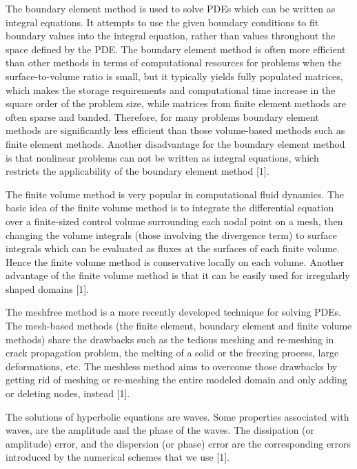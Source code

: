 \documentclass[a4paper,10pt,twoside]{article}
\begin{document}
The boundary element method is used to solve PDEs which can be
written as integral equations. It attempts
to use the given boundary conditions to fit boundary values into the integral
equation, rather than values throughout the space defined by the PDE. The boundary element method
is often more efficient than other methods in terms of computational resources
for problems when the surface-to-volume ratio is small, but it typically yields fully populated matrices, which makes
the storage requirements and computational time increase in the square order
of the problem size, while matrices from finite element methods are
often sparse and banded. Therefore, for many problems boundary element methods
are significantly less efficient than those volume-based methods such as finite
element methods. Another disadvantage for the boundary element method
is that nonlinear problems can not be written as integral equations, which restricts the applicability of the boundary element
method [1].

The finite volume method
is very popular in computational fluid dynamics. The basic idea of the finite
volume method is to integrate the differential equation over a finite-sized control
volume surrounding each nodal point on a mesh, then changing the volume
integrals (those involving the divergence term) to surface integrals which can
be evaluated as fluxes at the surfaces of each finite volume. Hence the finite
volume method is conservative locally on each volume. Another advantage of
the finite volume method is that it can be easily used for irregularly shaped
domains [1].

The meshfree method is a more recently developed technique
for solving PDEs. The mesh-based methods (the finite element, boundary
element and finite volume methods) share the drawbacks such as the tedious
meshing and re-meshing in crack propagation problem, the melting of a solid
or the freezing process, large deformations, etc. The meshless method aims
to overcome those drawbacks by getting rid of meshing or re-meshing the
entire modeled domain and only adding or deleting nodes, instead [1].

The solutions of hyperbolic equations are waves. Some properties associated with waves, are the amplitude and the
phase of the waves. The dissipation (or amplitude) error, and the dispersion (or
phase) error are the corresponding errors introduced by the numerical
schemes that we use [1].%
\end{document}
